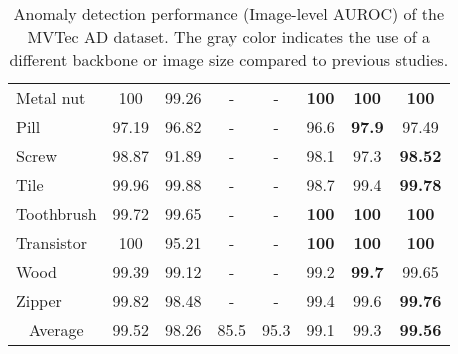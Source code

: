 \documentclass[10pt,onecolumn,letterpaper]{article}
\begin{document}
\begin{table*}[]
\begin{tabular}{l|c|ccccc|c}
Metal nut    & {\color{gray}100}             & {\color{gray}99.26} & - & -    & \textbf{100}     & \textbf{100}       & \textbf{100}      \\
Pill         & {\color{gray}97.19}           & {\color{gray}96.82} & - & -    & 96.6             & \textbf{97.9}      & 97.49             \\
Screw        & {\color{gray}98.87}           & {\color{gray}91.89} & - & -    & 98.1             & 97.3               & \textbf{98.52}    \\
Tile         & {\color{gray}99.96}           & {\color{gray}99.88} & - & -    & 98.7             & 99.4               & \textbf{99.78}    \\
Toothbrush   & {\color{gray}99.72}           & {\color{gray}99.65} & - & -    & \textbf{100}     & \textbf{100}       & \textbf{100}      \\
Transistor   & {\color{gray}100}             & {\color{gray}95.21} & - & -    & \textbf{100}     & \textbf{100}       & \textbf{100}      \\
Wood         & {\color{gray}99.39}           & {\color{gray}99.12} & - & -    & 99.2             & \textbf{99.7}      & 99.65             \\
Zipper       & {\color{gray}99.82}           & {\color{gray}98.48} & - & -    & 99.4             & 99.6               & \textbf{99.76}    \\
\hline
\multicolumn{1}{c|}{Average} & {\color{gray}99.52}        & {\color{gray}98.26}  & 85.5  & 95.3   & 99.1    & 99.3      & \textbf{99.56}  \\
\hline
\end{tabular}
\caption{Anomaly detection performance (Image-level AUROC) of the MVTec AD \cite{bergmann2019mvtec} dataset. The {\color{gray}gray} color indicates the use of a different backbone or image size compared to previous studies.}
\label{table:4}
\end{table*}
\end{document}
